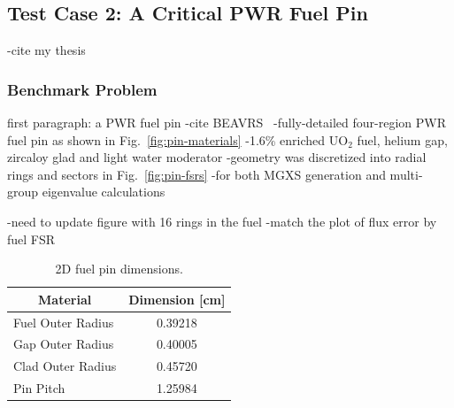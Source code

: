 \subsection{Test Case 2: A Critical PWR Fuel Pin}
\label{subsec:test-case2}

-cite my thesis~\cite{boyd2016thesis}


\subsubsection{Benchmark Problem}
\label{subsubsec:benchmark-case2}

first paragraph: a PWR fuel pin
-cite BEAVRS~\cite{horelik2013beavrs}
-fully-detailed four-region PWR fuel pin as shown in Fig.~\ref{fig:pin-materials}
  -1.6\% enriched UO$_2$ fuel, helium gap, zircaloy glad and light water moderator
-geometry was discretized into radial rings and sectors in Fig.~\ref{fig:pin-fsrs}
  -for both MGXS generation and multi-group eigenvalue calculations

-need to update figure with 16 rings in the fuel
  -match the plot of flux error by fuel FSR

\begin{table}[H]
  \centering
  \caption{2D fuel pin dimensions.}
  \label{table:pin-dimensions} 
  \begin{tabular}{l c}
  \toprule
  \multicolumn{1}{c}{\bf Material} &
  {\bf Dimension [cm]} \\
  \midrule
  Fuel Outer Radius & 0.39218 \\
  Gap Outer Radius &  0.40005 \\
  Clad Outer Radius & 0.45720 \\
  Pin Pitch &         1.25984 \\
  \bottomrule
\end{tabular}
\end{table}

